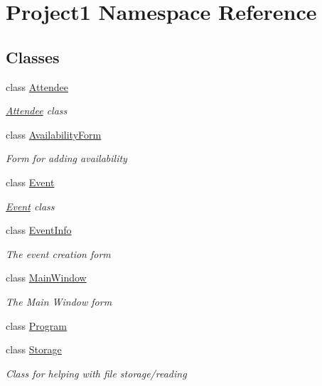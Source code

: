 \hypertarget{namespaceProject1}{}\section{Project1 Namespace Reference}
\label{namespaceProject1}
\subsection*{Classes}
\begin{DoxyCompactItemize}
\item 
class \hyperlink{classProject1_1_1Attendee}{Attendee}
\begin{DoxyCompactList}\small\item\em \hyperlink{classProject1_1_1Attendee}{Attendee} class \end{DoxyCompactList}\item 
class \hyperlink{classProject1_1_1AvailabilityForm}{Availability\+Form}
\begin{DoxyCompactList}\small\item\em Form for adding availability \end{DoxyCompactList}\item 
class \hyperlink{classProject1_1_1Event}{Event}
\begin{DoxyCompactList}\small\item\em \hyperlink{classProject1_1_1Event}{Event} class \end{DoxyCompactList}\item 
class \hyperlink{classProject1_1_1EventInfo}{Event\+Info}
\begin{DoxyCompactList}\small\item\em The event creation form \end{DoxyCompactList}\item 
class \hyperlink{classProject1_1_1MainWindow}{Main\+Window}
\begin{DoxyCompactList}\small\item\em The Main Window form \end{DoxyCompactList}\item 
class \hyperlink{classProject1_1_1Program}{Program}
\item 
class \hyperlink{classProject1_1_1Storage}{Storage}
\begin{DoxyCompactList}\small\item\em Class for helping with file storage/reading \end{DoxyCompactList}\end{DoxyCompactItemize}
